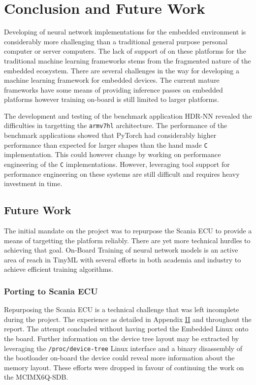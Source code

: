 \chapter{Conclusion and Future Work}

Developing of neural network implementations for the embedded environment is considerably more challenging than a traditional general purpose personal computer or server computers. The lack of support of on these platforms for the traditional machine learning frameworks stems from the fragmented nature of the embedded ecosystem. There are several challenges in the way for developing a machine learning framework for embedded devices. The current mature frameworks have some means of providing inference passes on embedded platforms however training on-board is still limited to larger platforms.

The development and testing of the benchmark application HDR-NN revealed the difficulties in targetting the \texttt{armv7hl} architecture. The performance of the benchmark applications showed that PyTorch had considerably higher performance than expected for larger shapes than the hand made \texttt{C} implementation. This could however change by working on performance engineering of the \texttt{C} implementations. However, leveraging tool support for performance engineering on these systems are still difficult and requires heavy investment in time.

\section{Future Work}

The initial mandate on the project was to repurpose the Scania ECU to provide a means of targetting the platform reliably. There are yet more technical hurdles to achieving that goal. On-Board Training of neural network models is an active area of reach in TinyML with several efforts in both academia and industry to achieve efficient training algorithms.

\subsection{Porting to Scania ECU}

Repurposing the Scania ECU is a technical challenge that was left incomplete during the project. The experience as detailed in Appendix \hyperref[rtc-c300]{II} and throughout the report. The attempt concluded without having ported the Embedded Linux onto the board. Further information on the device tree layout may be extracted by leveraging the \texttt{/proc/device-tree} Linux interface and a binary disassembly of the bootloader on-board the device could reveal more information about the memory layout. These efforts were dropped in favour of continuing the work on the MCIMX6Q-SDB.

